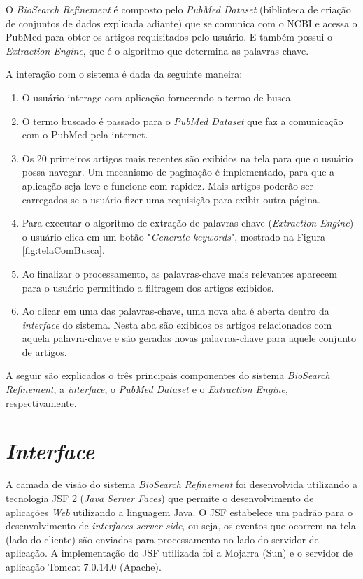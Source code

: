 O \emph{BioSearch Refinement} é composto pelo \emph{PubMed Dataset} (biblioteca de criação de conjuntos de dados explicada adiante) que se comunica com o NCBI e acessa o PubMed para obter os artigos requisitados pelo usuário. E também possui o \emph{Extraction Engine}, que é o algoritmo que determina as palavras-chave.

A interação com o sistema é dada da seguinte maneira:

\begin{enumerate}
    \item O usuário interage com aplicação fornecendo o termo de busca.
    \item O termo buscado é passado para o \emph{PubMed Dataset}  que faz a comunicação com o PubMed pela internet.
    \item Os 20 primeiros artigos mais recentes são exibidos na tela para que o usuário possa navegar. Um mecanismo de paginação é implementado, para que a aplicação seja leve e funcione com rapidez. Mais artigos poderão ser carregados se o usuário fizer uma requisição para exibir outra página.
    \item Para executar o algoritmo de extração de palavras-chave (\emph{Extraction Engine}) o usuário clica em um botão "\emph{Generate keywords}", mostrado na Figura \ref{fig:telaComBusca}.
    \item Ao finalizar o processamento, as palavras-chave mais relevantes aparecem para o usuário permitindo a filtragem dos artigos exibidos.
    \item Ao clicar em uma das palavras-chave, uma nova aba é aberta dentro da \emph{interface} do sistema. Nesta aba são exibidos os artigos relacionados com aquela palavra-chave e são geradas novas palavras-chave para aquele conjunto de artigos.
\end{enumerate}

A seguir são explicados o três principais componentes do sistema \emph{BioSearch Refinement}, a \emph{interface}, o \emph{PubMed Dataset} e o \emph{Extraction Engine}, respectivamente.

\section{\emph{Interface}}

A camada de visão do sistema \emph{BioSearch Refinement} foi desenvolvida utilizando a tecnologia JSF 2 (\emph{Java Server Faces}) que permite o desenvolvimento de aplicações \emph{Web} utilizando a linguagem Java. O JSF estabelece um padrão para o desenvolvimento de \emph{interfaces server-side}, ou seja, os eventos que ocorrem na tela (lado do cliente) são enviados para processamento no lado do servidor de aplicação. A implementação do JSF utilizada foi a Mojarra (Sun) e o servidor de aplicação Tomcat 7.0.14.0 (Apache).

